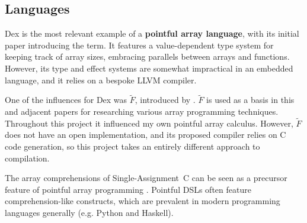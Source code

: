 \subsection{Languages}

Dex is the most relevant example of a \textbf{pointful array language}, with its initial paper \cite{paszke2021getting} introducing the term. 
It features a value-dependent type system for keeping track of array sizes, embracing parallels between arrays and functions. 
However, its type and effect systems are somewhat impractical in an embedded language, and it relies on a bespoke LLVM compiler.

One of the influences for Dex was $\tilde F$, introduced by \textcite{shaikhha2019efficient}. 
$\tilde F$ is used as a basis in this and adjacent papers for researching various array programming techniques.
Throughout this project it influenced my own pointful array calculus.
However, $\tilde F$ does not have an open implementation, and its proposed compiler relies on C code generation, so this project takes an entirely different approach to compilation. 

The array comprehensions of Single-Assignment~C can be seen as a precursor feature of pointful array programming \cite{scholz1994single}. Pointful DSLs often feature comprehension-like constructs, which are prevalent in modern programming languages generally (e.g. Python and Haskell). 





